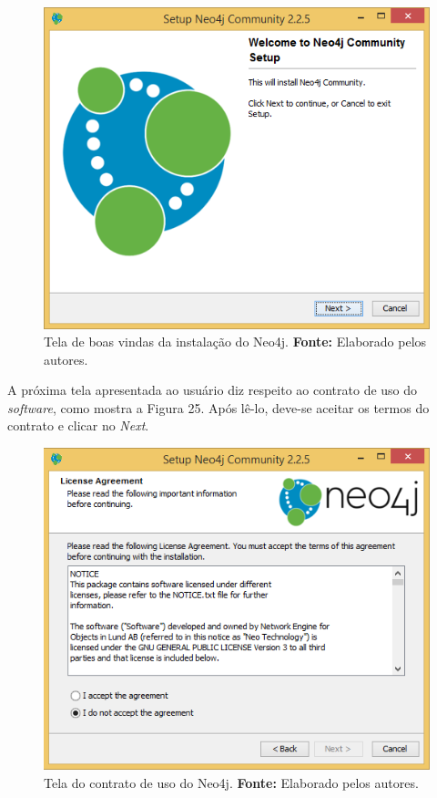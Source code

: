 \begin{figure}[h!]
	\centerline{\includegraphics[scale=0.4]{./imagens/neo4j-install-step1.png}}
	\caption[Tela de boas vindas da instalação do Neo4j]
	{Tela de boas vindas da instalação do Neo4j. \textbf{Fonte:} Elaborado pelos autores.}
	\label{fig:exemplo1}
\end{figure}

\par A próxima tela apresentada ao usuário diz respeito ao contrato de uso do \textit{software}, como mostra a Figura 25. Após lê-lo, deve-se aceitar os termos do contrato e clicar no \textit{Next}.

\newpage
\begin{figure}[h!]
	\centerline{\includegraphics[scale=0.4]{./imagens/neo4j-install-step2.png}}
	\caption[Tela do contrato de uso do Neo4j]
	{Tela do contrato de uso do Neo4j. \textbf{Fonte:} Elaborado pelos autores.}
	\label{fig:exemplo1}
\end{figure}

